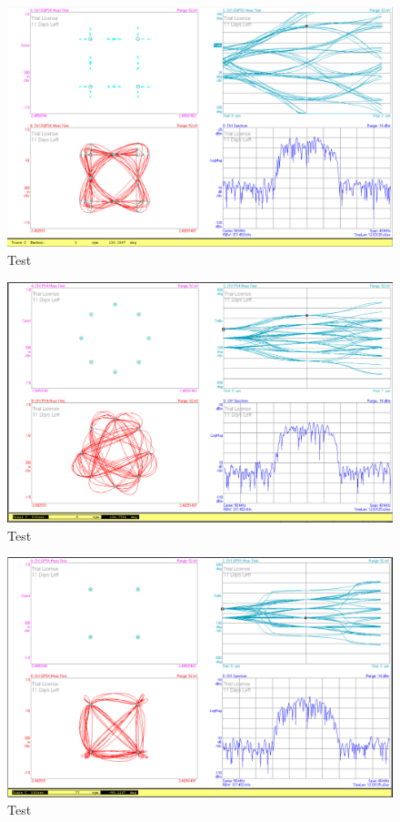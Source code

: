 \documentclass[12pt,a4paper,ngerman]{article}
\begin{document}
\begin{figure}[H]
\centering
\includegraphics[width=\textwidth]{figures/Aufgabe3_OQPSK_phase.jpg} 
\caption{Test}
\end{figure}

\begin{figure}[H]
\centering
\includegraphics[width=\textwidth]{figures/Aufgabe3_pi4DQPSK.jpg} 
\caption{Test}
\end{figure}

\begin{figure}[H]
\centering
\includegraphics[width=\textwidth]{figures/Aufgabe3_QPSK.jpg} 
\caption{Test}
\end{figure}
\end{document}
